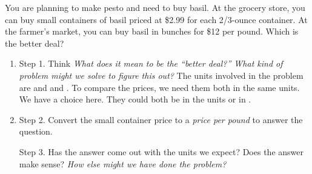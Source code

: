 You are planning to make pesto and need to buy basil.  At the grocery store, you can buy small containers of basil priced at 
\$2.99 for each 2/3-ounce container.  At the farmer’s market, you can buy basil in bunches for \$12 per pound.  Which is the better deal?

\begin{enumerate}
\item Step 1.  Think \emph{What does it mean to be the ``better deal?'' What kind of problem might we solve to figure this out?} 
The units involved in the problem are \underline{\hspace{1in}} and \underline{\hspace{1in}} and \underline{\hspace{1in}}.
	To compare the prices, we need them both in the same units.  We have a choice here.  They could both be in the units \underline{\hspace{1in}} or in \underline{\hspace{1in}}.

\item Step 2. Convert the small container price to a \emph{price per pound} to answer the question. 

\vspace{1in}

Step 3. Has the answer come out with the units we expect?  Does the answer make sense? \emph{How else might we have done the problem?}

\end{enumerate}
\vspace{2in}